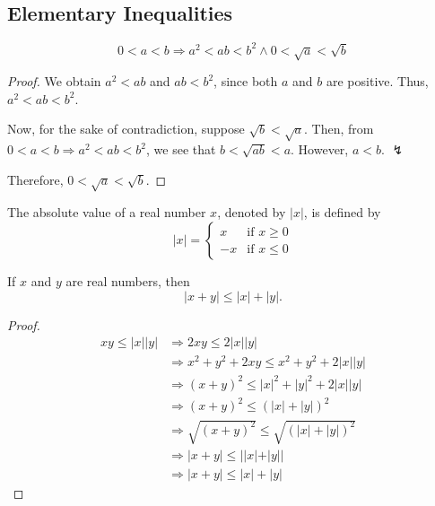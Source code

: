 \documentclass[../main.tex]{subfiles}
\begin{document}
\subsection{Elementary Inequalities}
\begin{prop}
    \[
        0 < a < b \Rightarrow a^2 < ab < b^2 \wedge 0 < \sqrt a < \sqrt b
    \]
\end{prop}
\begin{proof}
    We obtain $a^2 < ab$ and $ab < b^2$, since both $a$ and $b$ are positive.
    Thus, $a^2 < ab < b^2$.

    Now, for the sake of contradiction, suppose $\sqrt{b} < \sqrt{a}$.
    Then, from $0 < a < b \Rightarrow a^2 < ab < b^2$, we see that $b < \sqrt{ab} < a$.
    However, $a < b$. $\lightning$

    Therefore, $0 < \sqrt{a} < \sqrt{b}$.
\end{proof}

\begin{defn} \label{def:abs}
    The \textsf{absolute value} of a real number $x$, denoted by $|x|$, is defined by
    \[
        |x| = \begin{cases}
            x & \text{if } x \geq 0\\
            -x & \text{if } x \leq 0
        \end{cases}
    \]
\end{defn}

\begin{prop} \label{prop:tri}
    If $x$ and $y$ are real numbers, then 
    \[
        |x + y| \leq |x| + |y|.
    \]
\end{prop}
\begin{proof}
    \begin{align*}
        xy \leq |x||y| &\Rightarrow 2xy \leq 2|x||y|\\
                       &\Rightarrow x^2 + y^2 + 2xy \leq x^2 + y^2 + 2|x||y|\\
                       &\Rightarrow (x + y)^2 \leq |x|^2 + |y|^2 + 2|x||y|\\
                       &\Rightarrow (x + y)^2 \leq (|x| + |y|)^2\\
                       &\Rightarrow \sqrt{(x + y)^2} \leq \sqrt{(|x| + |y|)^2}\\
                       &\Rightarrow |x + y| \leq ||x| + |y||\\
                       &\Rightarrow |x + y| \leq |x| + |y|
    \end{align*}
\end{proof}
\end{document}
